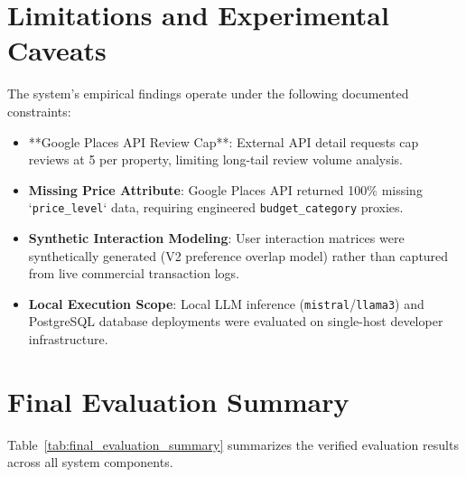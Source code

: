 \section{Limitations and Experimental Caveats}
The system's empirical findings operate under the following documented constraints:
\begin{itemize}
    \item **Google Places API Review Cap**: External API detail requests cap reviews at 5 per property, limiting long-tail review volume analysis.
    \item \textbf{Missing Price Attribute}: Google Places API returned 100\% missing `\texttt{price\_level}` data, requiring engineered \texttt{budget\_category} proxies.
    \item \textbf{Synthetic Interaction Modeling}: User interaction matrices were synthetically generated (V2 preference overlap model) rather than captured from live commercial transaction logs.
    \item \textbf{Local Execution Scope}: Local LLM inference (\texttt{mistral}/\texttt{llama3}) and PostgreSQL database deployments were evaluated on single-host developer infrastructure.
\end{itemize}

\section{Final Evaluation Summary}
Table~\ref{tab:final_evaluation_summary} summarizes the verified evaluation results across all system components.

